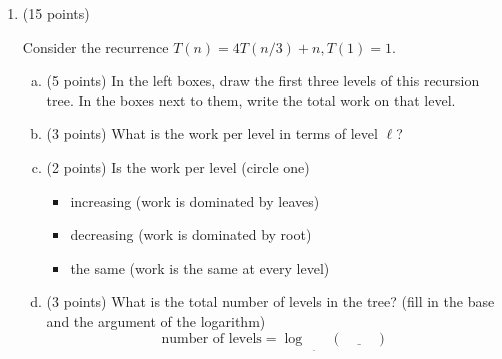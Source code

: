 \documentclass[11pt]{article}
\begin{document}
\begin{enumerate}
$\begin{array}{lccc}
T(n) = & \underline{\hspace{5cm}} & + & \underline{\hspace{5cm}} \\[2pt]
& \text{work done by recursive calls} & &  \text{nonrecursive work}
\end{array}$

\item (15 points)

Consider the recurrence $T(n) = 4T(n/3) + n, T(1) = 1$.

\begin{enumerate}[(a)]

\item (5 points) In the left boxes, draw the first three levels of this recursion tree.
In the boxes next to them, write the total work on that level.

\begin{center}
\end{center}
\item (3 points) What is the work per level in terms of level $\ell$?
\vspace{1in}
\item (2 points) Is the work per level (circle one)
\begin{itemize}
    \item increasing (work is dominated by leaves)
    \item decreasing (work is dominated by root)
    \item the same (work is the same at every level)
\end{itemize}
\item (3 points)  What is the total number of levels in the tree? (fill in the base and the argument of the logarithm)
\[
\text{number of levels} = \log_{\underline{\hspace{1cm}}}(\underline{\hspace{1cm}})
\]


\end{enumerate}
\end{enumerate}
\end{document}
